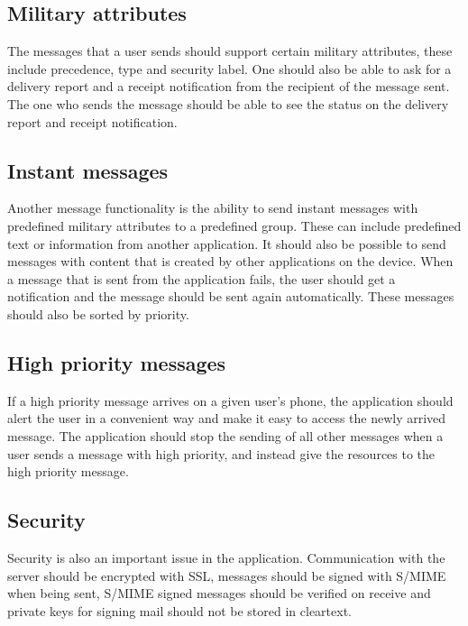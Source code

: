 \subsection{Military attributes}
The messages that a user sends should support certain military attributes, these include precedence, type and security label. 
\newline
\newline
One should also be able to ask for a delivery report and a receipt notification from the recipient of the message sent. The one who sends the message should be able to see the status on the delivery report and receipt notification.

\subsection{Instant messages}
Another message functionality is the ability to send instant messages with predefined military attributes to a predefined group. These can include predefined text or information from another application. It should also be possible to send messages with content that is created by other applications on the device.
\newline
\newline
When a message that is sent from the application fails, the user should get a notification and the message should be sent again automatically. These messages should also be sorted by priority.

\subsection{High priority messages}
If a high priority message arrives on a given user’s phone, the application should alert the user in a convenient way and make it easy to access the newly arrived message. The application should stop the sending of all other messages when a user sends a message with high priority, and instead give the resources to the high priority message.  

\subsection{Security}
Security is also an important issue in the application. Communication with the server should be encrypted with SSL, messages should be signed with S/MIME when being sent, S/MIME signed messages should be verified on receive and private keys for
signing mail should not be stored in cleartext.
